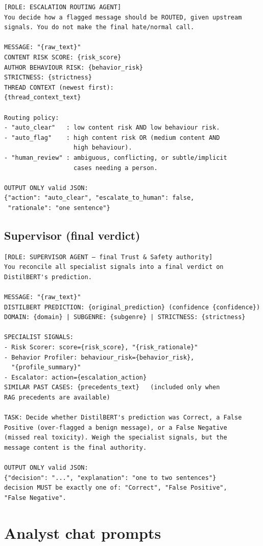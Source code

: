 \begin{verbatim}
[ROLE: ESCALATION ROUTING AGENT]
You decide how a flagged message should be ROUTED, given upstream 
signals. You do not make the final hate/normal call.

MESSAGE: "{raw_text}"
CONTENT RISK SCORE: {risk_score}
AUTHOR BEHAVIOUR RISK: {behavior_risk}
STRICTNESS: {strictness}
THREAD CONTEXT (newest first):
{thread_context_text}

Routing policy:
- "auto_clear"   : low content risk AND low behaviour risk.
- "auto_flag"    : high content risk OR (medium content AND 
                   high behaviour).
- "human_review" : ambiguous, conflicting, or subtle/implicit 
                   cases needing a person.

OUTPUT ONLY valid JSON:
{"action": "auto_clear", "escalate_to_human": false, 
 "rationale": "one sentence"}
\end{verbatim}

\subsection{Supervisor (final verdict)}\label{supervisor-final-verdict}

\begin{verbatim}
[ROLE: SUPERVISOR AGENT — final Trust & Safety authority]
You reconcile all specialist signals into a final verdict on 
DistilBERT's prediction.

MESSAGE: "{raw_text}"
DISTILBERT PREDICTION: {original_prediction} (confidence {confidence})
DOMAIN: {domain} | SUBGENRE: {subgenre} | STRICTNESS: {strictness}

SPECIALIST SIGNALS:
- Risk Scorer: score={risk_score}, "{risk_rationale}"
- Behavior Profiler: behaviour_risk={behavior_risk}, 
  "{profile_summary}"
- Escalator: action={escalation_action}
SIMILAR PAST CASES: {precedents_text}   (included only when 
RAG precedents are available)

TASK: Decide whether DistilBERT's prediction was Correct, a False 
Positive (over-flagged a benign message), or a False Negative 
(missed real toxicity). Weigh the specialist signals, but the 
message content is the final authority.

OUTPUT ONLY valid JSON: 
{"decision": "...", "explanation": "one to two sentences"}
decision MUST be exactly one of: "Correct", "False Positive", 
"False Negative".
\end{verbatim}

\section{Analyst chat prompts}\label{analyst-chat-prompts}

